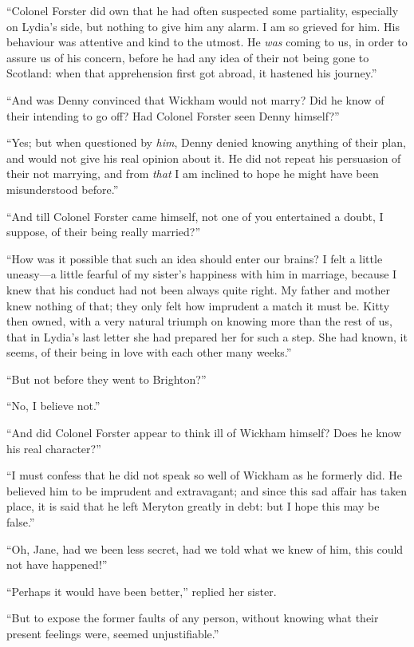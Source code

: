 \documentclass[12pt,openright]{book}
\begin{document}
“Colonel Forster did own that he had often suspected some partiality, especially on Lydia’s side, but nothing to give him any alarm. I am so grieved for him. His behaviour was attentive and kind to the utmost. He \textit{was} coming to us, in order to assure us of his concern, before he had any idea of their not being gone to Scotland: when that apprehension first got abroad, it hastened his journey.”

“And was Denny convinced that Wickham would not marry? Did he know of their intending to go off? Had Colonel Forster seen Denny himself?”

“Yes; but when questioned by \textit{him}, Denny denied knowing anything of their plan, and would not give his real opinion about it. He did not repeat his persuasion of their not marrying, and from \textit{that} I am inclined to hope he might have been misunderstood before.”

“And till Colonel Forster came himself, not one of you entertained a doubt, I suppose, of their being really married?”

“How was it possible that such an idea should enter our brains? I felt a little uneasy—a little fearful of my sister’s happiness with him in marriage, because I knew that his conduct had not been always quite right. My father and mother knew nothing of that; they only felt how imprudent a match it must be. Kitty then owned, with a very natural triumph on knowing more than the rest of us, that in Lydia’s last letter she had prepared her for such a step. She had known, it seems, of their being in love with each other many weeks.”

“But not before they went to Brighton?”

“No, I believe not.”

“And did Colonel Forster appear to think ill of Wickham himself? Does he know his real character?”

“I must confess that he did not speak so well of Wickham as he formerly did. He believed him to be imprudent and extravagant; and since this sad affair has taken place, it is said that he left Meryton greatly in debt: but I hope this may be false.”

“Oh, Jane, had we been less secret, had we told what we knew of him, this could not have happened!”

“Perhaps it would have been better,” replied her sister.

“But to expose the former faults of any person, without knowing what their present feelings were, seemed unjustifiable.”
\end{document}

